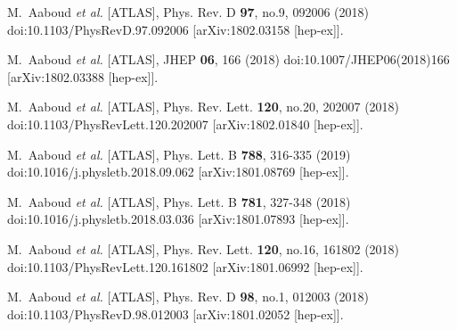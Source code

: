 \begin{thebibliography}{9}
M.~Aaboud \textit{et al.} [ATLAS],
Phys. Rev. D \textbf{97}, no.9, 092006 (2018)
doi:10.1103/PhysRevD.97.092006
[arXiv:1802.03158 [hep-ex]].

M.~Aaboud \textit{et al.} [ATLAS],
JHEP \textbf{06}, 166 (2018)
doi:10.1007/JHEP06(2018)166
[arXiv:1802.03388 [hep-ex]].

M.~Aaboud \textit{et al.} [ATLAS],
Phys. Rev. Lett. \textbf{120}, no.20, 202007 (2018)
doi:10.1103/PhysRevLett.120.202007
[arXiv:1802.01840 [hep-ex]].

M.~Aaboud \textit{et al.} [ATLAS],
Phys. Lett. B \textbf{788}, 316-335 (2019)
doi:10.1016/j.physletb.2018.09.062
[arXiv:1801.08769 [hep-ex]].

M.~Aaboud \textit{et al.} [ATLAS],
Phys. Lett. B \textbf{781}, 327-348 (2018)
doi:10.1016/j.physletb.2018.03.036
[arXiv:1801.07893 [hep-ex]].

M.~Aaboud \textit{et al.} [ATLAS],
Phys. Rev. Lett. \textbf{120}, no.16, 161802 (2018)
doi:10.1103/PhysRevLett.120.161802
[arXiv:1801.06992 [hep-ex]].

M.~Aaboud \textit{et al.} [ATLAS],
Phys. Rev. D \textbf{98}, no.1, 012003 (2018)
doi:10.1103/PhysRevD.98.012003
[arXiv:1801.02052 [hep-ex]].


\end{thebibliography}
